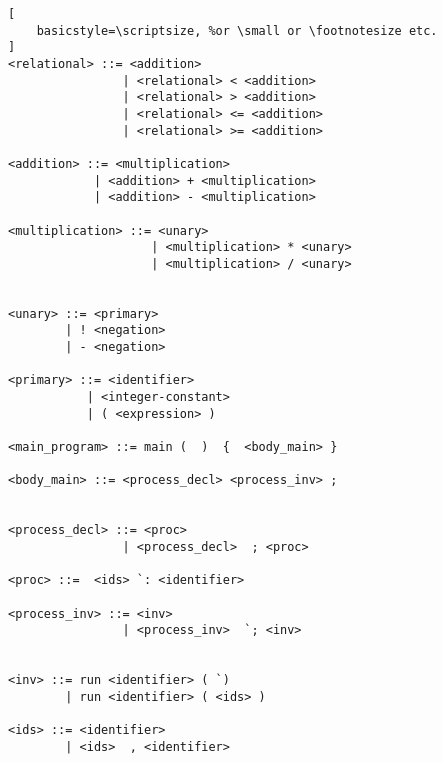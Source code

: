 \begin{lstlisting}[
    basicstyle=\scriptsize, %or \small or \footnotesize etc.
]
<relational> ::= <addition>
                | <relational> < <addition>
                | <relational> > <addition>
                | <relational> <= <addition>
                | <relational> >= <addition>

<addition> ::= <multiplication>
            | <addition> + <multiplication>
            | <addition> - <multiplication>

<multiplication> ::= <unary>
                    | <multiplication> * <unary>
                    | <multiplication> / <unary>

                
<unary> ::= <primary>
        | ! <negation> 
        | - <negation> 

<primary> ::= <identifier>
           | <integer-constant>
           | ( <expression> )

<main_program> ::= main (  )  {  <body_main> } 

<body_main> ::= <process_decl> <process_inv> ;


<process_decl> ::= <proc> 
                | <process_decl>  ; <proc>

<proc> ::=  <ids> `: <identifier> 
              
<process_inv> ::= <inv> 
                | <process_inv>  `; <inv>


<inv> ::= run <identifier> ( `)
        | run <identifier> ( <ids> )

<ids> ::= <identifier> 
        | <ids>  , <identifier>
\end{lstlisting}
